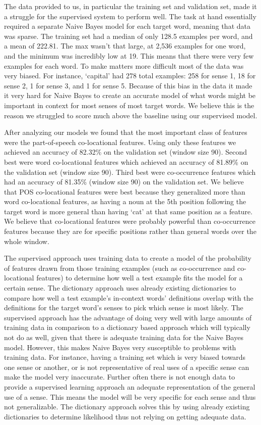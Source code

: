 \documentclass{article}
\begin{document}
The data provided to us, in particular the training set and validation set, made it a struggle for the supervised system to perform well. The task at hand essentially required a separate Naive Bayes model for each target word, meaning that data was sparse. The training set had a median of only 128.5 examples per word, and a mean of 222.81. The max wasn't that large, at 2,536 examples for one word, and the minimum was incredibly low at 19. This means that there were very few examples for each word. To make matters more difficult most of the data was very biased. For instance, `capital' had 278 total examples: 258 for sense 1, 18 for sense 2, 1 for sense 3, and 1 for sense 5. Because of this bias in the data it made it very hard for Naive Bayes to create an accurate model of what words might be important in context for most senses of most target words. We believe this is the reason we struggled to score much above the baseline using our supervised model. 

After analyzing our models we found that the most important class of features were the part-of-speech co-locational features. Using only these features we achieved an accuracy of 82.32\% on the validation set (window size 90). Second best were word co-locational features which achieved an accuracy of 81.89\% on the validation set (window size 90). Third best were co-occurrence features which had an accuracy of 81.35\% (window size 90) on the validation set. We believe that POS co-locational features were best because they generalized more than word co-locational features, as having a noun at the 5th position following the target word is more general than having `cat' at that same position as a feature. We believe that co-locational features were probably powerful than co-occurrence features because they are for specific positions rather than general words over the whole window.


The supervised approach uses training data to create a model of the probability of features drawn from those training examples (such as co-occurrence and co-locational features) to determine how well a test example fits the model for a certain sense. The dictionary approach uses already existing dictionaries to compare how well a test example's in-context words' definitions overlap with the definitions for the target word's senses to pick which sense is most likely. The supervised approach has the advantage of doing very well with large amounts of training data in comparison to a dictionary based approach which will typically not do as well, given that there is adequate training data for the Naive Bayes model. However, this makes Naive Bayes very susceptible to problems with training data. For instance, having a training set which is very biased towards one sense or another, or is not representative of real uses of a specific sense can make the model very inaccurate. Further often there is not enough data to provide a supervised learning approach an adequate representation of the general use of a sense. This means the model will be very specific for each sense and thus not generalizable. The dictionary approach solves this by using already existing dictionaries to determine likelihood thus not relying on getting adequate data. 
\end{document}
